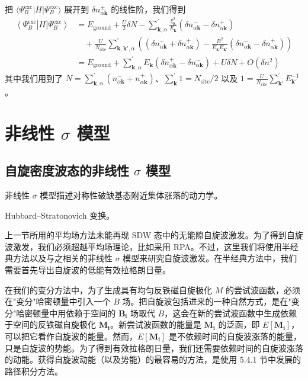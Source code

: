 把 $\langle\Psi^{\mathrm{exc}}_{B}|H|\Psi^{\mathrm{exc}}_{B}\rangle$ 展开到 $\delta n^{\pm}_{\alpha\pmb{k}}$ 的线性阶，我们得到
\begin{align*}
\left\langle \Psi^{\mathrm{exc}}_{B}\right|H\left|\Psi^{\mathrm{exc}}_{B}\right\rangle&=E_{\mathrm{ground}}+\frac{U}{2}\delta N-\sum^{\prime}_{\pmb{k},\alpha}\frac{\xi^{2}_{\pmb{k}}}{E_{\pmb{k}}}\left(\delta n^{-}_{\alpha\pmb{k}}-\delta n^{+}_{\alpha\pmb{k}}\right)\\
&\quad+\frac{U}{N_{\mathrm{site}}}\sum^{\prime}_{\pmb{k},\pmb{k}',\alpha}\left(\left(\delta n^{-}_{\alpha\pmb{k}}+\delta n^{+}_{\alpha\pmb{k}}\right)-\frac{B^{2}}{E_{\pmb{k}}E_{\pmb{k}'}}\left(\delta n^{-}_{\alpha\pmb{k}}-\delta n^{+}_{\alpha\pmb{k}}\right)\right)\\
&=E_{\mathrm{ground}}+\sum^{\prime}_{\pmb{k},\alpha}E_{\pmb{k}}\left(\delta n^{+}_{\alpha\pmb{k}}-\delta n^{-}_{\alpha\pmb{k}}\right)+U\delta N+O(\delta n^{2})
\end{align*}
其中我们用到了 $N=\sum^{\prime}_{\pmb{k},\alpha}(n^{-}_{\alpha\pmb{k}}+n^{+}_{\alpha\pmb{k}})$、$\sum^{\prime}_{\pmb{k}}1=N_{\mathrm{site}}/2$ 以及 $1=\frac{U}{N_{\mathrm{site}}}\sum^{\prime}_{\pmb{k}'}E^{-1}_{\pmb{k}'}$。

\section{非线性 $\sigma$ 模型}

\subsection{自旋密度波态的非线性 $\sigma$ 模型}

\begin{keypoints}
\item 非线性 $\sigma$ 模型描述对称性破缺基态附近集体涨落的动力学。
\item Hubbard--Stratonovich 变换。
\end{keypoints}

上一节所用的平均场方法未能再现 SDW 态中的无能隙自旋波激发。为了得到自旋波激发，我们必须超越平均场理论，比如采用 RPA。不过，这里我们将使用半经典方法以及与之相关的非线性 $\sigma$ 模型来研究自旋波激发。在半经典方法中，我们需要首先导出自旋波的低能有效拉格朗日量。

在我们的变分方法中，为了生成具有均匀反铁磁自旋极化 $M$ 的尝试波函数，必须在"变分"哈密顿量中引入一个 $B$ 场。把自旋波包括进来的一种自然方式，是在"变分"哈密顿量中用依赖于空间的 $\pmb{B}_{\pmb{i}}$ 场取代 $B$，这会在新的尝试波函数中生成依赖于空间的反铁磁自旋极化 $\pmb{M}_{\pmb{i}}$。新尝试波函数的能量是 $\pmb{M}_{\pmb{i}}$ 的泛函，即 $E[\pmb{M}_{\pmb{i}}]$，可以把它看作自旋波的能量。然而，$E[\pmb{M}_{\pmb{i}}]$ 是不依赖时间的自旋波涨落的能量，只是自旋波的势能。为了得到有效拉格朗日量，我们还需要依赖时间的自旋波涨落的动能。获得自旋波动能（以及势能）的最容易的方法，是使用 5.4.1 节中发展的路径积分方法。

